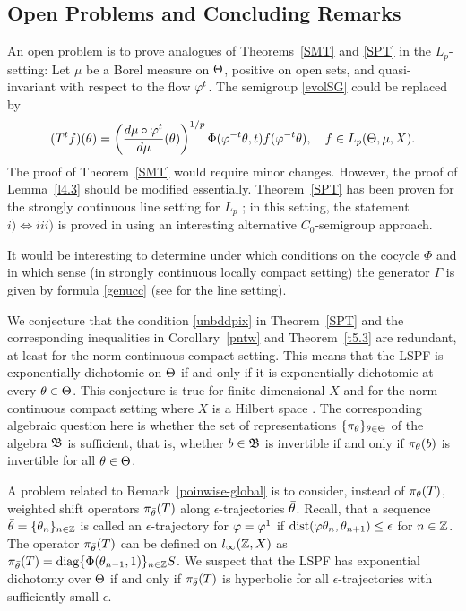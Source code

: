 \subsection{Open Problems and Concluding Remarks}

\begin{rem}\label{LP} An  open problem is to prove
analogues of Theorems~\ref{SMT} and \ref{SPT} in the
$L_p$-setting:  Let $\mu$ be a Borel measure on $\Theta$, positive on
open sets, and quasi-invariant with respect to the flow $\varphi^t$.
The semigroup \eqref{evolSG} could be replaced by
\[(T^tf)(\theta)=\left(\dfrac{d\mu\circ \varphi^t}{d\mu}(\theta)\right)^{1/p}
\Phi(\varphi^{-t}\theta,t)f(\varphi^{-t}\theta),\quad f\in L_p(\Theta,\mu,X).\]
The proof of Theorem~\ref{SMT} would require minor changes.
However, the proof of Lemma~\ref{l4.3}
should be modified essentially.
Theorem~\ref{SPT} has been proven for the
strongly continuous line setting for $L_p$ \cite{LMS1,LatRand};
in this setting, the statement $i)\Leftrightarrow iii)$
is proved  in \cite{Rab} using an
interesting alternative $C_0$-semigroup approach.
\end{rem}

\begin{rem}\label{Generators} It would be interesting to
determine under which conditions on the cocycle $\Phi$ and in which
sense (in strongly continuous locally compact setting) the
generator $\Gamma$ is given by formula \eqref{genucc} (see
\cite{Nag2,NagRh} for the line setting).
\end{rem}

\begin{rem}\label{poinwise-global} We conjecture that
the condition \eqref{unbddpix} in Theorem~\ref{SPT} and
the corresponding inequalities in Corollary~\ref{pntw}
and Theorem~\ref{t5.3}  are
redundant, at least for the norm continuous compact setting.
This means that the LSPF is exponentially dichotomic on
$\Theta$ if and only if it is exponentially dichotomic at every
$\theta\in \Theta$. This conjecture is
true for finite dimensional $X$ \cite[Lemma 2A]{SSSpT} and for the
norm continuous compact setting where $X$ is a Hilbert space
\cite{LS}. The corresponding algebraic question here is whether the
set of representations $\{\pi_\theta\}_{\theta\in \Theta}$ of the algebra ${\frak{B}}$ is
sufficient, that is, whether $b\in{\frak{B}}$ is invertible if and only if
$\pi_\theta(b)$ is invertible for all $\theta\in \Theta$.
\end{rem}

\begin{rem}\label{epstraj} A problem related
to Remark~\ref{poinwise-global} is to
consider, instead of $\pi_\theta(T)$, weighted shift operators
$\pi_{\bar{\theta}}(T)$ along
$\epsilon$-trajectories $\bar{\theta}$. Recall,
that a sequence $\bar{\theta}=\{\theta_n\}_{n\in{\Bbb{Z}}}$ is called an
$\epsilon$-trajectory for $\varphi=\varphi^1$ if $\text{dist}
(\varphi \theta_n,\theta_{n+1})\leq \epsilon$ for $n\in{\Bbb{Z}}$. The operator
$\pi_{\bar{\theta}}(T)$ can be defined on $l_\infty({\Bbb{Z}},X)$ as
$\pi_{\bar{\theta}}(T)=\operatorname{diag}\{\Phi(\theta_{n-1},1)\}_{n\in{\Bbb{Z}}} S$. We
suspect that the LSPF has exponential dichotomy over $\Theta$ if and
only if $\pi_{\bar{\theta}}(T)$ is hyperbolic for all
$\epsilon$-trajectories  with sufficiently small $\epsilon$.
\end{rem}

